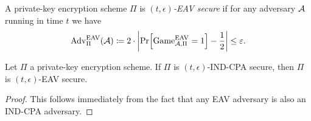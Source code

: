 \begin{definition}
	A private-key encryption scheme $\Pi$ is \emph{$(t, \epsilon)$-EAV secure} if for any adversary $\mathcal{A}$ running in time $t$ we have
	\begin{align*}
		\mathrm{Adv}_{\Pi}^{\mathrm{EAV}}(\adv) \coloneqq 2 \cdot \abs*{\pr{\mathrm{Game}_{\adv, \Pi}^{\mathrm{EAV}} = 1} - \frac{1}{2}} \le \epsilon.
	\end{align*}
\end{definition}


\begin{lemma}
	Let $\Pi$ a private-key encryption scheme. If $\Pi$ is $(t, \epsilon)$-IND-CPA secure, then $\Pi$ is $(t, \epsilon)$-EAV secure.
\end{lemma}
\begin{proof}
	This follows immediately from the fact that any EAV adversary is also an IND-CPA adversary.
\end{proof}


